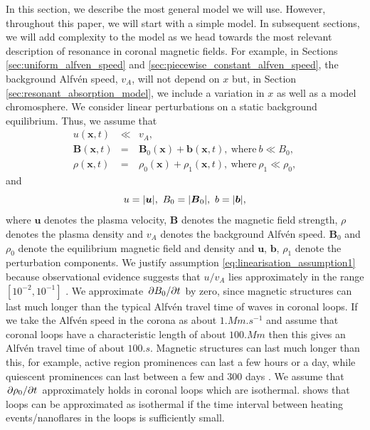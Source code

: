 \documentclass[linenumbers]{aastex63}
\let\vec\boldsymbol
\begin{document}
In this section, we describe the most general model we will use. However, throughout this paper, we will start with a simple model. In subsequent sections, we will add complexity to the model as we head
towards the most relevant description of resonance in coronal magnetic fields. For example, in Sections \ref{sec:uniform_alfven_speed} and \ref{sec:piecewise_constant_alfven_speed}, the background Alfv\'en speed, $v_A$, will not depend on $x$ but, in Section \ref{sec:resonant_absorption_model}, we include a variation in $x$ as well as a model chromosphere. We consider linear perturbations on a static background equilibrium. Thus, we assume that
\begin{eqnarray}
    \label{eq:linearisation_assumption1}
    u(\vec{x},t) & \ll & v_A, \\
    \label{eq:linearisation_assumption2}
    \vec{B}(\vec{x},t) & = & \vec{B}_0(\vec{x}) + \vec{b}(\vec{x},t),\ \text{where}\ b \ll B_0, \\
    \label{eq:linearisation_assumption3}
    \rho(\vec{x},t) & = & \rho_0(\vec{x}) + \rho_1(\vec{x},t),\ \text{where}\ \rho_1 \ll \rho_0,
\end{eqnarray}
and 
\begin{equation}
    u = \abs{\vec{u}},\ B_0=\abs{\vec{B}_0},\ b=\abs{\vec{b}},
\end{equation}
where $\vec{u}$ denotes the plasma velocity, $\vec{B}$ denotes the magnetic field strength, $\rho$ denotes the plasma density and $v_A$ denotes the background Alfv\'en speed. $\vec{B}_0$ and $\rho_0$ denote the equilibrium magnetic field and density and $\vec{u}$, $\vec{b}$, $\rho_1$ denote the perturbation components. We justify assumption \eqref{eq:linearisation_assumption1} because observational evidence suggests that $u / v_A$ lies approximately in the range $[10^{-2},10^{-1}]$ \citep{McIntosh2011,McIntosh2012}. We approximate $\pdv*{B_0}{t}$ by zero, since magnetic structures can last much longer than the typical Alfv\'en travel time of waves in coronal loops. If we take the Alfv\'en speed in the corona as about $1\si{.Mm.s^{-1}}$ and assume that coronal loops have a characteristic length of about $100\si{.Mm}$ then this gives an Alfv\'en travel time of about $100\si{.s}$. 
Magnetic structures can last much longer than this, for example, active region prominences can last a few hours or a day, while quiescent prominences can last between a few and 300 days \citep{Priest2014}. We assume that $\pdv*{\rho_0}{t}$ approximately holds in coronal loops which are isothermal. \citet{Klimchuk2015} shows that loops can be approximated as isothermal if the time interval between heating events/nanoflares in the loops is sufficiently small.
\end{document}
